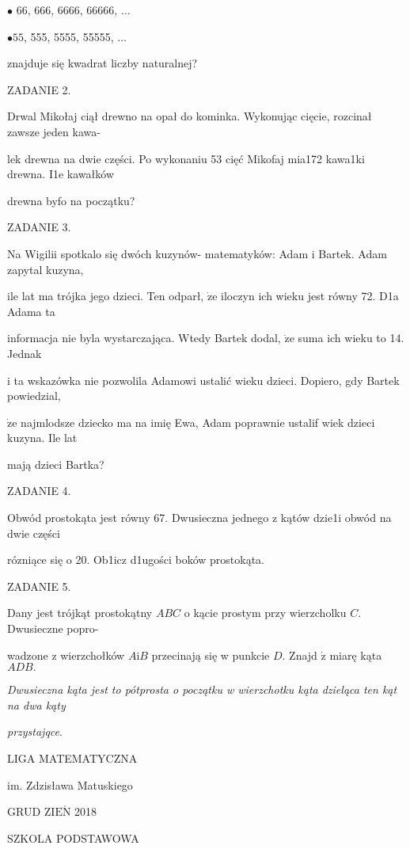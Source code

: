 \documentclass[a4paper,12pt]{article}
\begin{document}
$\bullet$ 66, 666, 6666, 66666, $\ldots$

$\bullet 55$, 555, 5555, 55555, $\ldots$

znajduje się kwadrat liczby naturalnej?

ZADANIE 2.

Drwal Mikołaj ciął drewno na opał do kominka. Wykonując cięcie, rozcinał zawsze jeden kawa-

lek drewna na dwie części. Po wykonaniu 53 cięć Mikofaj mia172 kawa1ki drewna. I1e kawałków

drewna byfo na początku?

ZADANIE 3.

Na Wigilii spotkalo się dwóch kuzynów- matematyków: Adam i Bartek. Adam zapytal kuzyna,

ile lat ma trójka jego dzieci. Ten odparł, $\dot{\mathrm{z}}\mathrm{e}$ iloczyn ich wieku jest równy 72. D1a Adama ta

informacja nie byla wystarczająca. Wtedy Bartek dodal, $\dot{\mathrm{z}}\mathrm{e}$ suma ich wieku to 14. Jednak

i ta wskazówka nie pozwolila Adamowi ustalić wieku dzieci. Dopiero, gdy Bartek powiedzial,

$\dot{\mathrm{z}}\mathrm{e}$ najmlodsze dziecko ma na imię Ewa, Adam poprawnie ustalif wiek dzieci kuzyna. Ile lat

mają dzieci Bartka?

ZADANIE 4.

Obwód prostokąta jest równy 67. Dwusieczna jednego z kątów dzie1i obwód na dwie części

rózniące się o 20. Ob1icz d1ugości boków prostokąta.

ZADANIE 5.

Dany jest trójkąt prostokątny $ABC$ o kącie prostym przy wierzcholku $C$. Dwusieczne popro-

wadzone z wierzchołków $A\mathrm{i}B$ przecinają się w punkcie $D.$ Znajd $\acute{\mathrm{z}}$ miarę kąta $ADB.$

{\it Dwusieczna kąta jest to pótprosta o początku w wierzchotku kąta dzieląca ten kąt na dwa kąty}

{\it przystajqce}.






LIGA MATEMATYCZNA

im. Zdzisława Matuskiego

GRUD Z$\mathrm{I}\mathrm{E}\acute{\mathrm{N}}$ 2018

SZKOLA PODSTAWOWA
\end{document}

